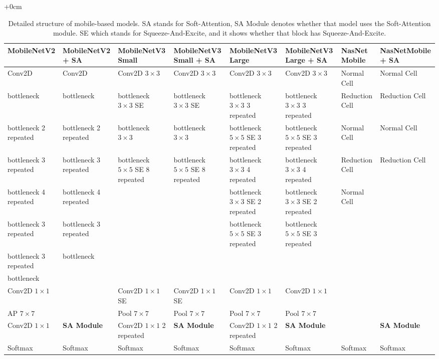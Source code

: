 \documentclass[sensors,article,accept,pdftex,moreauthors]{Definitions/mdpi}
\begin{document}
\begin{adjustwidth}{+\extralength}{0cm}
	\begin{table}[H]
		\caption{{Detailed} structure of mobile-based models. SA stands for Soft-Attention, SA Module denotes whether that model uses the Soft-Attention module. SE which stands for Squeeze-And-Excite, and it shows whether that block has Squeeze-And-Excite. \label{appendix-table:detailed mobile model structure}}%
\begin{tabularx}{\textwidth}{p{3cm}  p{3cm}  p{4.2cm}  p{3cm}  p{3cm}  p{3cm}  p{2.3cm}  p{2.3cm}}
	\toprule
	\textbf{MobileNetV2} & \textbf{MobileNetV2 + SA} & \textbf{MobileNetV3 Small} & \textbf{MobileNetV3 Small + SA} & \textbf{MobileNetV3 Large} & \textbf{MobileNetV3 Large + SA} & \textbf{NasNet Mobile} & \textbf{NasNetMobile + SA}\\
	\midrule
	Conv2D & Conv2D& Conv2D $3 \times 3$& Conv2D $3 \times 3$& Conv2D $3 \times 3$& Conv2D $3 \times 3$ & Normal Cell & Normal Cell\\	\midrule		
	bottleneck & bottleneck & bottleneck $3 \times 3$ SE& bottleneck $3 \times 3$ SE& bottleneck $3 \times 3$ 3 repeated& bottleneck $3 \times 3$ 3 repeated& Reduction Cell& Reduction Cell\\ \midrule		
	bottleneck 2 repeated& bottleneck 2 repeated& bottleneck $3 \times 3$& bottleneck $3 \times 3$& bottleneck $5 \times 5$ SE 3 repeated& bottleneck $5 \times 5$ SE 3 repeated & Normal Cell & Normal Cell\\ \midrule	
	bottleneck 3 repeated& bottleneck 3 repeated& bottleneck $5 \times 5$ SE 8 repeated& bottleneck $5 \times 5$ SE 8 repeated& bottleneck $3 \times 3$ 4 repeated& bottleneck $3 \times 3$ 4 repeated& Reduction Cell & Reduction Cell\\ \midrule	
	bottleneck 4 repeated& bottleneck 4 repeated& & & bottleneck $3 \times 3$ SE 2 repeated& bottleneck $3 \times 3$ SE 2 repeated & Normal Cell\\ \midrule	
	bottleneck 3 repeated& bottleneck 3 repeated& & & bottleneck $5 \times 5$ SE 3 repeated& bottleneck $5 \times 5$ SE 3 repeated& \\ \midrule	
	bottleneck 3 repeated& bottleneck & & & & & \\ \midrule	
	bottleneck & & & & & & \\ \midrule
	Conv2D $1 \times 1$ & & Conv2D $1 \times 1$ SE & Conv2D $1 \times 1$ SE& Conv2D $1 \times 1$& Conv2D $1 \times 1$ & & \\ \midrule
	AP $7 \times 7$ & & Pool $7 \times 7$& Pool $7 \times 7$& Pool $7 \times 7$& Pool $7 \times 7$& &\\ \midrule
	Conv2D $1 \times 1$ & \textbf{SA Module}& Conv2D $1 \times 1$ 2 repeated& \textbf{SA Module}& Conv2D $1 \times 1$ 2 repeated& \textbf{SA Module}& &\textbf{SA Module}\\ \midrule
	Softmax & Softmax& Softmax& Softmax& Softmax& Softmax& Softmax & Softmax\\ 
	\bottomrule
\end{tabularx}
	\end{table}

\end{adjustwidth}	\finishlandscape
\end{document}
